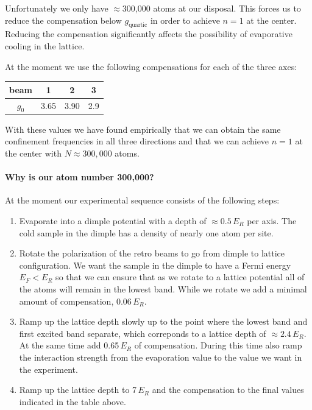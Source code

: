 \documentclass[11pt,letter]{article}
\begin{document}
Unfortunately we only have $\approx$300,000 atoms at our disposal.   This forces us to
reduce the compensation below $g_{\text{quartic}}$  in order to achieve $n=1$
at the center.   Reducing  the compensation significantly affects the
possibility of evaporative cooling in the lattice.   
 
At the moment we use the following compensations for each of the three axes:
\begin{center}
\begin{tabular}{ c|c|c|c}
   beam & 1 & 2 & 3 \\
   \hline
   $g_{0}$ & 3.65 &  3.90 & 2.9 \\ 
\end{tabular}
\end{center}
With these values we have found empirically that we can obtain the same
confinement frequencies in all three directions and that we can achieve $n=1$
at the center with $N\approx300,000$ atoms.  


\paragraph{Why is our atom number 300,000?}   At the moment our
experimental sequence consists of the following steps:
\begin{enumerate}
\item  Evaporate into a dimple potential with a depth of $\approx 0.5\,E_{R}$
per axis.   The cold sample in the dimple has a density of nearly one atom
per site.  

\item  Rotate the polarization of the retro beams to go from dimple to
lattice configuration.   We want the sample in the dimple to have a Fermi
energy $E_{F} < E_{R}$ so that we can ensure that as we rotate to a lattice
potential all of the atoms will remain in the lowest band.   While we rotate
we add a minimal amount of compensation, 0.06\,$E_{R}$.  

\item  Ramp up the lattice depth slowly up to the point where the lowest band
and first excited band separate, which correponds to a lattice depth of
$\approx 2.4\,E_{R}$.  At the same time add 0.65\,$E_{R}$ of compensation.
During this time also ramp the interaction strength from the evaporation
value to the value we want in the experiment.  

\item Ramp up the lattice depth to 7\,$E_{R}$ and the compensation to the
final values indicated in the table above. 
\end{enumerate}
\end{document}
